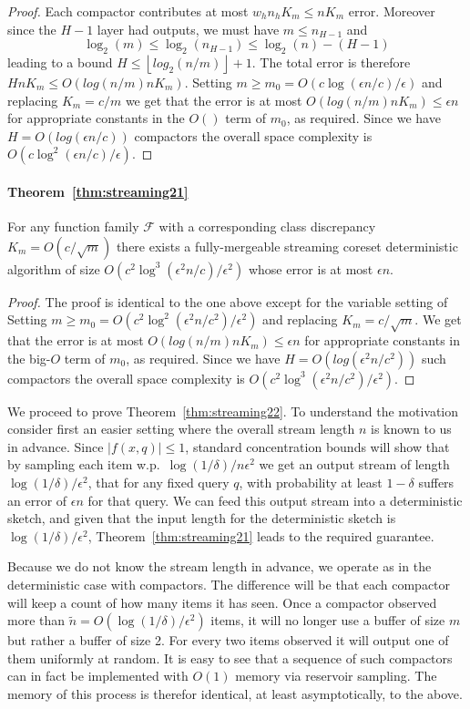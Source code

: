 \documentclass[anon,12pt]{colt2019} %
\newcommand{\eps}{\epsilon}
\newcommand{\F}{\mathcal{F}}
\newcommand{\floor}[1]{\left \lfloor #1 \right \rfloor}
\begin{document}
{\begin{proof}
Each compactor contributes at most $w_h n_h K_m \le n K_m$ error. Moreover since the $H-1$ layer had outputs, we must have $m \leq n_{H-1}$ and
$$  \log_2(m) \leq \log_2(n_{H-1}) \leq \log_2(n) - (H-1)$$
leading to a bound $H \le \floor{log_2(n/m)}+1$.
The total error is therefore $H n K_m \le O(log(n/m) n K_m)$. 
Setting $m \ge m_0 = O(c\log(\eps n/c)/\eps)$ and replacing $K_m = c/m$ we get that the error is at most $O(log(n/m) n K_m) \le \eps n$ for appropriate constants in the $O()$ term of $m_0$, as required. 
Since we have $H = O(log(\eps n/c))$ compactors the overall space complexity is $O(c\log^2(\eps n/c)/\eps)$. 
\end{proof}

\paragraph{Theorem~\ref{thm:streaming21}}
For any function family $\F$ with a corresponding class discrepancy $K_m = O(c/\sqrt{m})$ there exists a fully-mergeable streaming coreset deterministic algorithm of size $O\left(c^2\log^3(\eps^2 n/c) /\eps^2\right)$ whose error is at most $\eps n$. 
\begin{proof}
The proof is identical to the one above except for the variable setting of
Setting $m \ge m_0 = O(c^2\log^2(\eps^2 n/c^2)/\eps^2)$ and replacing $K_m = c/\sqrt{m}$. 
We get that the error is at most $O(log(n/m) n K_m) \le \eps n$ for appropriate constants in the big-$O$ term of $m_0$, as required. 
Since we have $H = O(log(\eps^2 n/c^2))$ such compactors the overall space complexity is $O\left(c^2\log^3(\eps^2 n/c^2) /\eps^2\right)$. 
\end{proof}

We proceed to prove Theorem~\ref{thm:streaming22}. To understand the motivation consider first an easier setting where the overall stream length $n$ is known to us in advance. Since $|f(x,q)| \leq 1$, standard concentration bounds will show that by sampling each item w.p.\ $\log(1/\delta)/n\eps^2$ we get an output stream of length $\log(1/\delta)/\eps^2$, that for any fixed query $q$, with probability at least $1-\delta$ suffers an error of $\eps n$ for that query. We can feed this output stream into a deterministic sketch, and given that the input length for the deterministic sketch is $\log(1/\delta)/\eps^2$, Theorem~\ref{thm:streaming21} leads to the required guarantee.

Because we do not know the stream length in advance, we operate as in the deterministic case with compactors. The difference will be that each compactor will keep a count of how many items it has seen. Once a compactor observed more than $\tilde{n} = O(\log(1/\delta)/\eps^2)$ items, it will no longer use a buffer of size $m$ but rather a buffer of size 2. For every two items observed it will output one of them uniformly at random. It is easy to see that a sequence of such compactors can in fact be implemented with $O(1)$ memory via reservoir sampling. The memory of this process is therefor identical, at least asymptotically, to the above.

}
\end{document}
